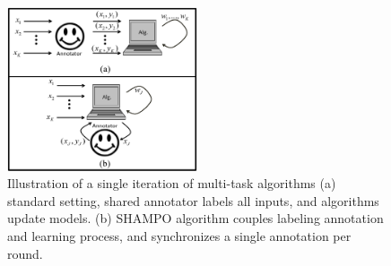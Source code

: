 \begin{figure}
\begin{centering}
\includegraphics[width=0.5\textwidth]{figs/SHAMPO_illustration.eps}
\caption{Illustration of a single iteration of  multi-task algorithms (a) standard setting, shared annotator labels all inputs, and algorithms update models. (b) SHAMPO algorithm couples labeling annotation and learning process, and synchronizes a single annotation per round.}
\label{fig:ilustration}
\end{centering}
\end{figure}


